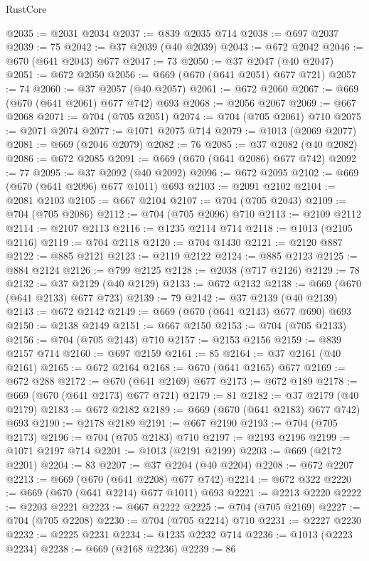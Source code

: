 \begin{lexlean}{RustCore}
\begin{coremodule}
@2035 := @2031 @2034
@2037 := @839 @2035 @714
@2038 := @697 @2037
@2039 := 75
@2042 := @37 @2039 (@40 @2039)
@2043 := @672 @2042
@2046 := @670 (@641 @2043) @677
@2047 := 73
@2050 := @37 @2047 (@40 @2047)
@2051 := @672 @2050
@2056 := @669 (@670 (@641 @2051) @677 @721)
@2057 := 74
@2060 := @37 @2057 (@40 @2057)
@2061 := @672 @2060
@2067 := @669 (@670 (@641 @2061) @677 @742) @693
@2068 := @2056 @2067
@2069 := @667 @2068
@2071 := @704 (@705 @2051)
@2074 := @704 (@705 @2061) @710
@2075 := @2071 @2074
@2077 := @1071 @2075 @714
@2079 := @1013 (@2069 @2077)
@2081 := @669 (@2046 @2079)
@2082 := 76
@2085 := @37 @2082 (@40 @2082)
@2086 := @672 @2085
@2091 := @669 (@670 (@641 @2086) @677 @742)
@2092 := 77
@2095 := @37 @2092 (@40 @2092)
@2096 := @672 @2095
@2102 := @669 (@670 (@641 @2096) @677 @1011) @693
@2103 := @2091 @2102
@2104 := @2081 @2103
@2105 := @667 @2104
@2107 := @704 (@705 @2043)
@2109 := @704 (@705 @2086)
@2112 := @704 (@705 @2096) @710
@2113 := @2109 @2112
@2114 := @2107 @2113
@2116 := @1235 @2114 @714
@2118 := @1013 (@2105 @2116)
@2119 := @704 @2118
@2120 := @704 @1430
@2121 := @2120 @887
@2122 := @885 @2121
@2123 := @2119 @2122
@2124 := @885 @2123
@2125 := @884 @2124
@2126 := @799 @2125
@2128 := @2038 (@717 @2126)
@2129 := 78
@2132 := @37 @2129 (@40 @2129)
@2133 := @672 @2132
@2138 := @669 (@670 (@641 @2133) @677 @723)
@2139 := 79
@2142 := @37 @2139 (@40 @2139)
@2143 := @672 @2142
@2149 := @669 (@670 (@641 @2143) @677 @690) @693
@2150 := @2138 @2149
@2151 := @667 @2150
@2153 := @704 (@705 @2133)
@2156 := @704 (@705 @2143) @710
@2157 := @2153 @2156
@2159 := @839 @2157 @714
@2160 := @697 @2159
@2161 := 85
@2164 := @37 @2161 (@40 @2161)
@2165 := @672 @2164
@2168 := @670 (@641 @2165) @677
@2169 := @672 @288
@2172 := @670 (@641 @2169) @677
@2173 := @672 @189
@2178 := @669 (@670 (@641 @2173) @677 @721)
@2179 := 81
@2182 := @37 @2179 (@40 @2179)
@2183 := @672 @2182
@2189 := @669 (@670 (@641 @2183) @677 @742) @693
@2190 := @2178 @2189
@2191 := @667 @2190
@2193 := @704 (@705 @2173)
@2196 := @704 (@705 @2183) @710
@2197 := @2193 @2196
@2199 := @1071 @2197 @714
@2201 := @1013 (@2191 @2199)
@2203 := @669 (@2172 @2201)
@2204 := 83
@2207 := @37 @2204 (@40 @2204)
@2208 := @672 @2207
@2213 := @669 (@670 (@641 @2208) @677 @742)
@2214 := @672 @322
@2220 := @669 (@670 (@641 @2214) @677 @1011) @693
@2221 := @2213 @2220
@2222 := @2203 @2221
@2223 := @667 @2222
@2225 := @704 (@705 @2169)
@2227 := @704 (@705 @2208)
@2230 := @704 (@705 @2214) @710
@2231 := @2227 @2230
@2232 := @2225 @2231
@2234 := @1235 @2232 @714
@2236 := @1013 (@2223 @2234)
@2238 := @669 (@2168 @2236)
@2239 := 86

\end{coremodule}
\end{lexlean}
